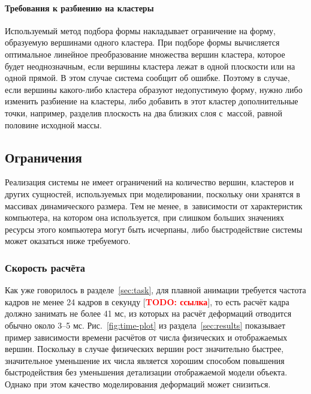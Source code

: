 \documentclass[a4paper, 14pt, titlepage]{extarticle}
\newcommand{\todo}[1]{\textbf{\textcolor{red}{TODO: #1}}}
\begin{document}
      \paragraph{Требования к разбиению на кластеры}
      Используемый метод подбора формы накладывает ограничение на форму, образуемую вершинами одного
      кластера. При подборе формы вычисляется оптимальное линейное преобразование множества
      вершин кластера, которое будет неоднозначным, если вершины кластера лежат в одной плоскости
      или на одной прямой. В этом случае система сообщит об ошибке. Поэтому в случае, если вершины
      какого-либо кластера образуют недопустимую форму, нужно либо изменить разбиение на
      кластеры, либо добавить в этот кластер дополнительные точки, например, разделив плоскость на
      два близких слоя с~массой, равной половине исходной массы.

    \subsection{Ограничения}

      Реализация системы не имеет ограничений на количество вершин, кластеров и других сущностей,
      используемых при моделировании, поскольку они хранятся в массивах динамического размера. Тем
      не менее, в~зависимости от характеристик компьютера, на котором она используется, при слишком
      больших значениях ресурсы этого компьютера могут быть исчерпаны, либо быстродействие системы
      может оказаться ниже требуемого.

      \subsubsection{Скорость расчёта}

        Как уже говорилось в разделе~\ref{sec:task}, для плавной анимации требуется частота кадров
        не менее 24 кадров в секунду [\todo{ссылка}], то есть расчёт кадра должно занимать не более 41
        мс, из которых на расчёт деформаций отводится обычно около 3--5 мс. Рис.~\ref{fig:time-plot}
        из раздела~\ref{sec:results} показывает пример зависимости времени расчётов от числа физических
        и отображаемых вершин. Поскольку в случае физических вершин рост значительно быстрее,
        значительное уменьшение их числа является хорошим способом повышения быстродействия без уменьшения
        детализации отображаемой модели объекта. Однако при этом качество моделирования деформаций
        может снизиться.
\end{document}
